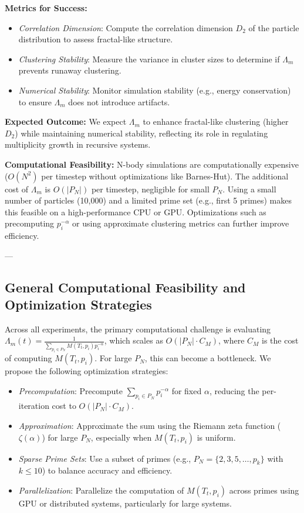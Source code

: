 \documentclass{article}
\theoremstyle{plain}
\begin{document}
\textbf{Metrics for Success:}
\begin{itemize}
    \item \textit{Correlation Dimension}: Compute the correlation dimension \(D_2\) of the particle distribution to assess fractal-like structure.
    \item \textit{Clustering Stability}: Measure the variance in cluster sizes to determine if \(\Lambda_m\) prevents runaway clustering.
    \item \textit{Numerical Stability}: Monitor simulation stability (e.g., energy conservation) to ensure \(\Lambda_m\) does not introduce artifacts.
\end{itemize}

\textbf{Expected Outcome:} We expect \(\Lambda_m\) to enhance fractal-like clustering (higher \(D_2\)) while maintaining numerical stability, reflecting its role in regulating multiplicity growth in recursive systems.

\textbf{Computational Feasibility:} N-body simulations are computationally expensive (\(O(N^2)\) per timestep without optimizations like Barnes-Hut). The additional cost of \(\Lambda_m\) is \(O(|P_N|)\) per timestep, negligible for small \(P_N\). Using a small number of particles (10,000) and a limited prime set (e.g., first 5 primes) makes this feasible on a high-performance CPU or GPU. Optimizations such as precomputing \(p_i^{-\alpha}\) or using approximate clustering metrics can further improve efficiency.

---

\subsection{General Computational Feasibility and Optimization Strategies}
\label{subsec:comp_feasibility}

Across all experiments, the primary computational challenge is evaluating \(\Lambda_m(t) = \frac{1}{\sum_{p_i \in P_N} M(T_t, p_i) p_i^{-\alpha}}\), which scales as \(O(|P_N| \cdot C_M)\), where \(C_M\) is the cost of computing \(M(T_t, p_i)\). For large \(P_N\), this can become a bottleneck. We propose the following optimization strategies:
\begin{itemize}
    \item \textit{Precomputation}: Precompute \(\sum_{p_i \in P_N} p_i^{-\alpha}\) for fixed \(\alpha\), reducing the per-iteration cost to \(O(|P_N| \cdot C_M)\).
    \item \textit{Approximation}: Approximate the sum using the Riemann zeta function (\(\zeta(\alpha)\)) for large \(P_N\), especially when \(M(T_t, p_i)\) is uniform.
    \item \textit{Sparse Prime Sets}: Use a subset of primes (e.g., \(P_N = \{2, 3, 5, \ldots, p_k\}\) with \(k \leq 10\)) to balance accuracy and efficiency.
    \item \textit{Parallelization}: Parallelize the computation of \(M(T_t, p_i)\) across primes using GPU or distributed systems, particularly for large systems.
\end{itemize}
\end{document}
